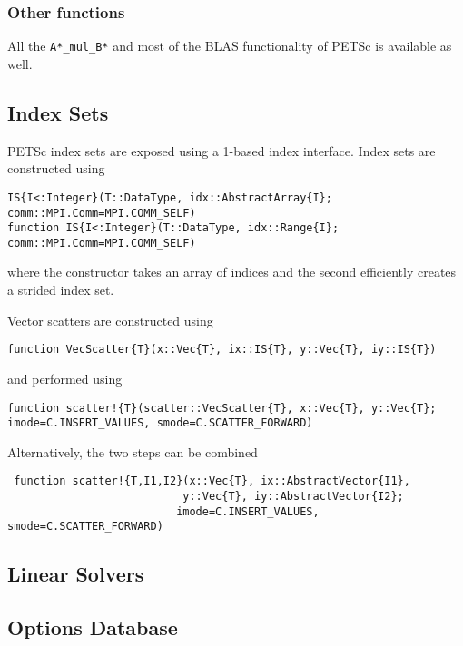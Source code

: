 \documentclass{article}
\newcommand{\ttt}{\texttt}
\begin{document}
\subsubsection{Other functions}
All the \ttt{A*\_mul\_B*} and most of the BLAS functionality of PETSc is available as well.

\subsection{Index Sets} \label{sec:is}
PETSc index sets are exposed using a 1-based index interface.
Index sets are constructed using

\begin{verbatim}
IS{I<:Integer}(T::DataType, idx::AbstractArray{I}; comm::MPI.Comm=MPI.COMM_SELF)
function IS{I<:Integer}(T::DataType, idx::Range{I}; comm::MPI.Comm=MPI.COMM_SELF)
\end{verbatim}

where the constructor takes an array of indices and the second efficiently creates a strided index set.

Vector scatters are constructed using

\begin{verbatim}
function VecScatter{T}(x::Vec{T}, ix::IS{T}, y::Vec{T}, iy::IS{T})
\end{verbatim}

and performed using

\begin{verbatim}
function scatter!{T}(scatter::VecScatter{T}, x::Vec{T}, y::Vec{T}; imode=C.INSERT_VALUES, smode=C.SCATTER_FORWARD)
\end{verbatim}

Alternatively, the two steps can be combined
\begin{verbatim}
 function scatter!{T,I1,I2}(x::Vec{T}, ix::AbstractVector{I1},
                           y::Vec{T}, iy::AbstractVector{I2};
                          imode=C.INSERT_VALUES, smode=C.SCATTER_FORWARD)
\end{verbatim}


\subsection{Linear Solvers} \label{sec:ksp}

\subsection{Options Database} \label{sec:options}
\end{document}
